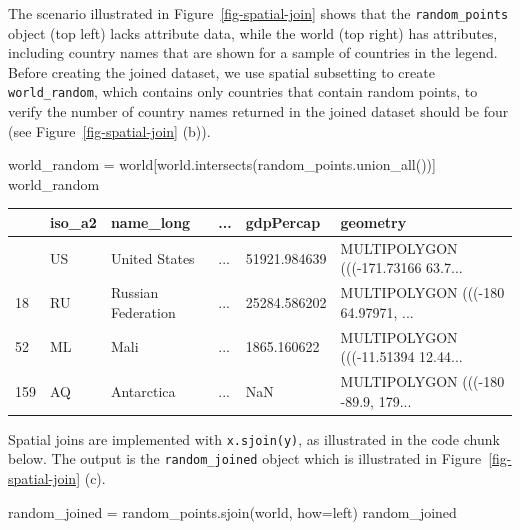 \documentclass[
  letterpaper,
]{krantz}
\newenvironment{Shaded}{\begin{snugshade}}{\end{snugshade}}
\newcommand{\NormalTok}[1]{\textcolor[rgb]{0.00,0.23,0.31}{#1}}
\newcommand{\OperatorTok}[1]{\textcolor[rgb]{0.37,0.37,0.37}{#1}}
\newcommand{\StringTok}[1]{\textcolor[rgb]{0.13,0.47,0.30}{#1}}
\begin{document}
The scenario illustrated in Figure~\ref{fig-spatial-join} shows that the
\texttt{random\_points} object (top left) lacks attribute data, while
the world (top right) has attributes, including country names that are
shown for a sample of countries in the legend. Before creating the
joined dataset, we use spatial subsetting to create
\texttt{world\_random}, which contains only countries that contain
random points, to verify the number of country names returned in the
joined dataset should be four (see Figure~\ref{fig-spatial-join} (b)).

\begin{Shaded}
\begin{Highlighting}[]
\NormalTok{world\_random }\OperatorTok{=}\NormalTok{ world[world.intersects(random\_points.union\_all())]}
\NormalTok{world\_random}
\end{Highlighting}
\end{Shaded}

\begin{longtable}[]{@{}llllll@{}}
\toprule\noalign{}
& iso\_a2 & name\_long & ... & gdpPercap & geometry \\
\midrule\noalign{}
\endhead
\bottomrule\noalign{}
\endlastfoot
4 & US & United States & ... & 51921.984639 & MULTIPOLYGON (((-171.73166
63.7... \\
18 & RU & Russian Federation & ... & 25284.586202 & MULTIPOLYGON (((-180
64.97971, ... \\
52 & ML & Mali & ... & 1865.160622 & MULTIPOLYGON (((-11.51394
12.44... \\
159 & AQ & Antarctica & ... & NaN & MULTIPOLYGON (((-180 -89.9,
179... \\
\end{longtable}

Spatial joins are implemented with \texttt{x.sjoin(y)}, as illustrated
in the code chunk below. The output is the \texttt{random\_joined}
object which is illustrated in Figure~\ref{fig-spatial-join} (c).

\begin{Shaded}
\begin{Highlighting}[]
\NormalTok{random\_joined }\OperatorTok{=}\NormalTok{ random\_points.sjoin(world, how}\OperatorTok{=}\StringTok{\textquotesingle{}left\textquotesingle{}}\NormalTok{)}
\NormalTok{random\_joined}
\end{Highlighting}
\end{Shaded}
\end{document}
